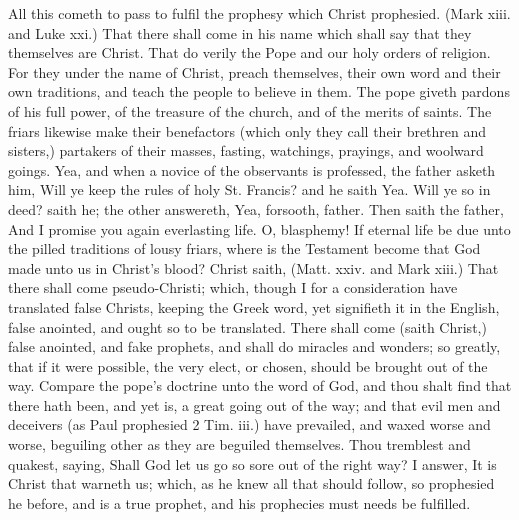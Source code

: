 All this cometh to pass to fulfil the prophesy which 
Christ prophesied. (Mark xiii. and Luke xxi.) That 
there shall come in his name which shall say that they 
themselves are Christ. That do verily the Pope and our 
holy orders of religion. For they under the name of Christ, 
preach themselves, their own word and their own traditions,
and teach the people to believe in them. The pope 
giveth pardons of his full power, of the treasure of the 
church, and of the merits of saints. The friars likewise 
make their benefactors (which only they call their brethren 
and sisters,) partakers of their masses, fasting, watchings, 
prayings, and woolward goings. Yea, and when a novice 
of the observants is professed, the father asketh him, 
Will ye keep the rules of holy St. Francis? and he saith 
Yea. Will ye so in deed? saith he; the other answereth, 
Yea, forsooth, father. Then saith the father, And I 
promise you again everlasting life. O, blasphemy! If 
eternal life be due unto the pilled traditions of lousy friars, 
where is the Testament become that God made unto us 
in Christ's blood? Christ saith, (Matt. xxiv. and Mark 
xiii.) That there shall come pseudo-Christi; which, 
though I for a consideration have translated false Christs, 
keeping the Greek word, yet signifieth it in the English, 
false anointed, and ought so to be translated. There 
shall come (saith Christ,) false anointed, and fake prophets,
and shall do miracles and wonders; so greatly, that 
if it were possible, the very elect, or chosen, should be 
brought out of the way. Compare the pope's doctrine 
unto the word of God, and thou shalt find that there hath 
been, and yet is, a great going out of the way; and that 
evil men and deceivers (as Paul prophesied 2 Tim. iii.) 
have prevailed, and waxed worse and worse, beguiling 
other as they are beguiled themselves. Thou tremblest 
and quakest, saying, Shall God let us go so sore out of 
the right way? I answer, It is Christ that warneth us; 
which, as he knew all that should follow, so prophesied 
he before, and is a true prophet, and his prophecies must 
needs be fulfilled. 

